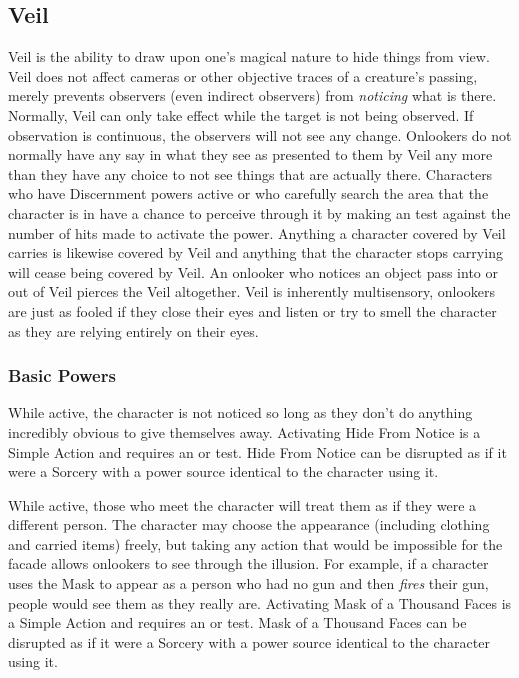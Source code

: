 \subsection{Veil}

Veil is the ability to draw upon one's magical nature to hide things from view. Veil does not affect cameras or other objective traces of a creature's passing, merely prevents observers (even indirect observers) from \textit{noticing} what is there. Normally, Veil can only take effect while the target is not being observed. If observation is continuous, the observers will not see any change. Onlookers do not normally have any say in what they see as presented to them by Veil any more than they have any choice to not see things that are actually there. Characters who have Discernment powers active or who carefully search the area that the character is in have a chance to perceive through it by making an  test against the number of hits made to activate the power. Anything a character covered by Veil carries is likewise covered by Veil and anything that the character stops carrying will cease being covered by Veil. An onlooker who notices an object pass into or out of Veil pierces the Veil altogether. Veil is inherently multisensory, onlookers are just as fooled if they close their eyes and listen or try to smell the character as they are relying entirely on their eyes.

\subsubsection{Basic Powers}

 While active, the character is not noticed so long as they don't do anything incredibly obvious to give themselves away. Activating Hide From Notice is a Simple Action and requires an  or  test. Hide From Notice can be disrupted as if it were a Sorcery with a power source identical to the character using it.

 While active, those who meet the character will treat them as if they were a different person. The character may choose the appearance (including clothing and carried items) freely, but taking any action that would be impossible for the facade allows onlookers to see through the illusion. For example, if a character uses the Mask to appear as a person who had no gun and then \textit{fires} their gun, people would see them as they really are. Activating Mask of a Thousand Faces is a Simple Action and requires an  or  test. Mask of a Thousand Faces can be disrupted as if it were a Sorcery with a power source identical to the character using it.


